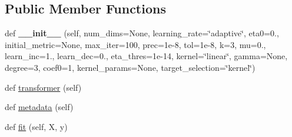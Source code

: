 \subsection*{Public Member Functions}
\begin{DoxyCompactItemize}
\item 
def {\bfseries \+\_\+\+\_\+init\+\_\+\+\_\+} (self, num\+\_\+dims=None, learning\+\_\+rate=\char`\"{}adaptive\char`\"{}, eta0=0., initial\+\_\+metric=None, max\+\_\+iter=100, prec=1e-\/8, tol=1e-\/8, k=3, mu=0., learn\+\_\+inc=1., learn\+\_\+dec=0., eta\+\_\+thres=1e-\/14, kernel=\char`\"{}linear\char`\"{}, gamma=\+None, degree=3, coef0=1, kernel\+\_\+params=\+None, target\+\_\+selection=\char`\"{}kernel\char`\"{})\hypertarget{classdml_1_1lmnn_1_1KLMNN_a339202f51571616cccbb7e82a9538277}{}\label{classdml_1_1lmnn_1_1KLMNN_a339202f51571616cccbb7e82a9538277}

\item 
def \hyperlink{classdml_1_1lmnn_1_1KLMNN_a77fd2cabceaea0fb542887add9dbeac0}{transformer} (self)
\item 
def \hyperlink{classdml_1_1lmnn_1_1KLMNN_aeb84c2956168954dbfddec72a01bc5dd}{metadata} (self)
\item 
def \hyperlink{classdml_1_1lmnn_1_1KLMNN_aed2b8b1e6de22d4e6170d4a270d78623}{fit} (self, X, y)
\end{DoxyCompactItemize}
